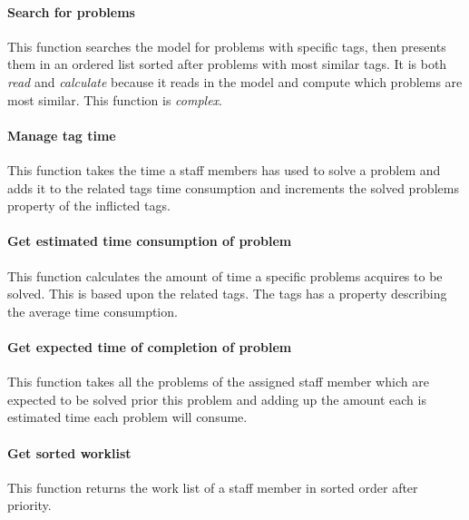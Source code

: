 \paragraph{Search for problems }
This function searches the model for problems with specific tags, then presents them in an ordered list sorted after problems with most similar tags. 
It is both \textit{read} and \textit{calculate} because it reads in the model and compute which problems are most similar. 
This function is \textit{complex}.


\paragraph{Manage tag time}
This function takes the time a staff members has used to solve a problem and adds it to the related tags time consumption and increments the solved problems property of the inflicted tags. 

\paragraph{Get estimated time consumption of problem }
This function calculates the amount of time a specific problems acquires to be solved. This is based upon the related tags. 
The tags has a property describing the average time consumption.  

\paragraph{Get expected time of completion of problem}
This function takes all the problems of the assigned staff member which are expected to be solved prior this problem and adding up the amount each is estimated time each problem will consume.

\paragraph{Get sorted worklist}
This function returns the work list of a staff member in sorted order after priority. 

